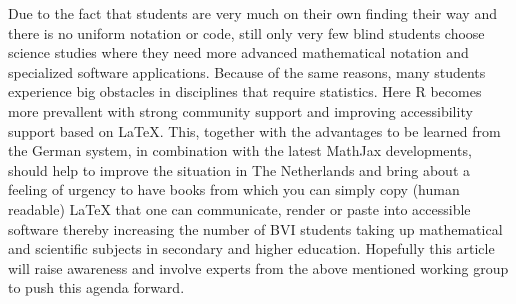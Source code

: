 \documentclass{easychair}
\begin{document}
Due to the fact that students are very much on their own finding their way and
there is no uniform notation or code, still only very few blind students choose
science studies where they need more advanced mathematical notation and
specialized software applications. Because of the same reasons, many students
experience big obstacles in disciplines that require statistics. Here R becomes
more prevallent with strong community support and improving accessibility
support based on {\LaTeX}. This, together with the advantages to be learned from
the German system, in combination with the latest MathJax developments, should
help to improve the situation in The Netherlands and bring about a feeling of
urgency to have books from which you can simply copy (human readable) {\LaTeX}
that one can communicate, render or paste into accessible software thereby
increasing the number of BVI students taking up mathematical and scientific
subjects in secondary and higher education. Hopefully this article will raise
awareness and involve experts from the above mentioned working group to push
this agenda forward.





\end{document}
